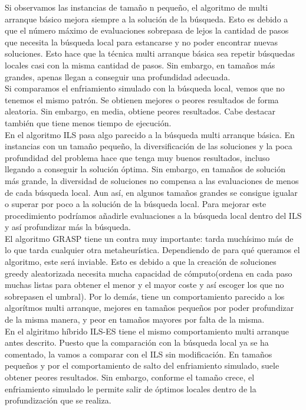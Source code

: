 Si observamos las instancias de tamaño n pequeño, el algoritmo de multi arranque básico mejora siempre a la solución de la búsqueda. Esto es debido a que el número máximo de evaluaciones sobrepasa de lejos la cantidad de pasos que necesita la búsqueda local para estancarse y no poder encontrar nuevas soluciones. Esto hace que la técnica multi arranque básica sea repetir búsquedas locales casi con la misma cantidad de pasos. Sin embargo, en tamaños más grandes, apenas llegan a conseguir una profundidad adecuada. \\

Si comparamos el enfriamiento simulado con la búsqueda local, vemos que no tenemos el mismo patrón. Se obtienen mejores o peores resultados de forma aleatoria. Sin embargo, en media, obtiene peores resultados. Cabe destacar también que tiene menos tiempo de ejecución.\\

En el algoritmo ILS pasa algo parecido a la búsqueda multi arranque básica. En instancias con un tamaño pequeño, la diversificación de las soluciones y la poca profundidad del problema hace que tenga muy buenos resultados, incluso llegando a  conseguir la solución óptima. Sin embargo, en tamaños de solución más grande, la diversidad de soluciones no compensa a las evaluaciones de menos de cada búsqueda local. Aun así, en algunos tamaños grandes se consigue igualar o superar por  poco a la solución de la búsqueda local. Para mejorar este procedimiento podríamos añadirle evaluaciones a la búsqueda local dentro del ILS y así profundizar más la búsqueda.\\

El algoritmo GRASP tiene un contra muy importante: tarda muchísimo más de lo que tarda cualquier otra metaheurística. Dependiendo de para qué queramos el algoritmo, este será inviable. Esto es debido a que la creación de soluciones greedy aleatorizada necesita mucha capacidad de cómputo(ordena en cada paso muchas listas para obtener el menor y el mayor coste y así escoger los que no sobrepasen el umbral). Por lo demás, tiene un comportamiento parecido a los algorítmos multi arranque, mejores en tamaños pequeños por poder profundizar de la misma manera, y peor en tamaños mayores por falta de la misma. \\

En el algiritmo híbrido ILS-ES tiene el mismo comportamiento multi arranque antes descrito. Puesto que la comparación con la búsqueda local ya se ha comentado, la vamos a comparar con el ILS sin modificación. En tamaños pequeños y por el comportamiento de salto del enfriamiento simulado, suele obtener peores resultados. Sin embargo, conforme el tamaño crece, el enfriamiento simulado le permite salir de óptimos locales dentro de la profundización que se realiza.\\


